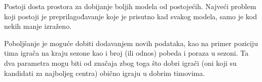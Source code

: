 \documentclass[a4paper]{article}
\begin{document}
Postoji dosta prostora za dobijanje boljih modela od postojećih. Najveći problem koji postoji je preprilagođavanje koje je prisutno kad svakog modela, samo je kod nekih manje izraženo.

Poboljšanje je moguće dobiti dodavanjem novih podataka, kao na primer poziciju tima igrača na kraju sezone kao i broj (ili odnos) pobeda i poraza u sezoni. Ta dva parametra mogu biti od značaja zbog toga što dobri igrači (oni koji su kandidati za najboljeg centra) obično igraju u dobrim timovima.

\pagebreak

\appendix


\appendix
\end{document}
